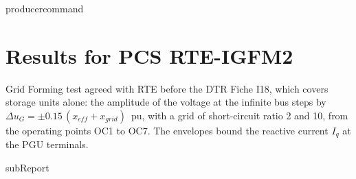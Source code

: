 {{ producercommand }}



    \section{Results for PCS RTE-IGFM2}

    Grid Forming test agreed with RTE before the DTR Fiche I18, which covers storage units
    alone: the amplitude of the voltage at the infinite bus steps by
    \(\Delta u_G = \pm 0.15\,(x_{eff} + x_{grid})\)~pu, with a grid of short-circuit ratio 2
    and 10, from the operating points OC1 to OC7. The envelopes bound the reactive current
    \(I_q\) at the PGU terminals.

    {{subReport}}
    \newpage
